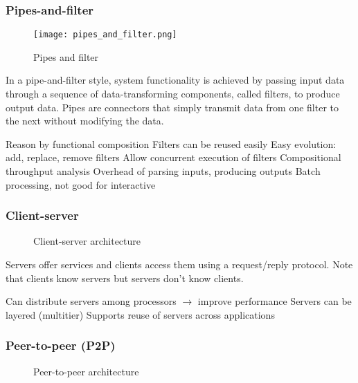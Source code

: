 \subsubsection{Pipes-and-filter}

\begin{figure}[!ht]
    \centering
    \texttt{[image: pipes\_and\_filter.png]}
    \caption{Pipes and filter}
\end{figure}

In a pipe-and-filter style, system functionality is achieved by passing input
data through a sequence of data-transforming components, called filters, to
produce output data. Pipes are connectors that simply transmit data from one
filter to the next without modifying the data.

\begin{itemize}
    \proitem{} Reason by functional composition
    \proitem{} Filters can be reused easily
    \proitem{} Easy evolution: add, replace, remove filters
    \proitem{} Allow concurrent execution of filters
    \proitem{} Compositional throughput analysis
    \consitem{} Overhead of parsing inputs, producing outputs
    \consitem{} Batch processing, not good for interactive
\end{itemize}

\subsubsection{Client-server}

\begin{figure}[!ht]
    \centering
    
    \caption{Client-server architecture}
\end{figure}

Servers offer services and clients access them using a request/reply protocol.
Note that clients know servers but servers don't know clients.

\begin{itemize}
    \proitem{} Can distribute servers among processors $\rightarrow$ improve
    performance
    \proitem{} Servers can be layered (multitier)
    \proitem{} Supports reuse of servers across applications
\end{itemize}

\subsubsection{Peer-to-peer (P2P)}
\begin{figure}[!ht]
    \centering
    \begin{scriptsize}
        
    \end{scriptsize}
    \caption{Peer-to-peer architecture}
\end{figure}

